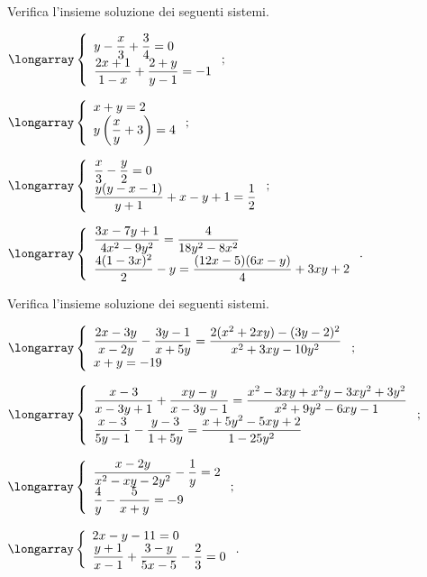 \begin{esercizio}[\Ast]
 \label{ese:22.47}
Verifica l'insieme soluzione dei seguenti sistemi.

\begin{enumeratea}
\item $\longarray\left\{\begin{array}{l}y-\dfrac{x}{3}+\dfrac{3}{4}=0\\\dfrac{2x+1}{1-x}+\dfrac{2+y}{y-1}=-1\end{array}\right.;$
\item $\longarray\left\{\begin{array}{l}x+y=2\\y\left(\dfrac{x}{y}+3\right)=4\end{array}\right.;$
\item $\longarray\left\{\begin{array}{l}\dfrac{x}{3}-\dfrac{y}{2}=0\\\dfrac{y(y-x-1)}{y+1}+x-y+1=\dfrac{1}{2}\end{array}\right.;$
\item $\longarray\left\{\begin{array}{l}\dfrac{3x-7y+1}{4x^{2}-9y^{2}}=\dfrac{4}{18y^{2}-8x^{2}}\\\dfrac{4(1-3x)^{2}}{2}-y=\dfrac{(12x-5)(6x-y)}{4}+3xy+2\end{array}\right..$
\end{enumeratea}
\end{esercizio}

\begin{esercizio}[\Ast]
 \label{ese:22.48}
Verifica l'insieme soluzione dei seguenti sistemi.

\begin{enumeratea}
\item $\longarray\left\{\begin{array}{l}\dfrac{2x-3y}{x-2y}-\dfrac{3y-1}{x+5y}=\dfrac{2(x^{2}+2xy)-(3y-2)^{2}}{x^{2}+3xy-10y^{2}}\\x+y=-19\end{array}\right.;$
\item $\longarray\left\{\begin{array}{l}\dfrac{x-3}{x-3y+1}+\dfrac{xy-y}{x-3y-1}=\dfrac{x^{2}-3xy+x^{2}y-3xy^{2}+3y^{2}}{x^{2}+9y^{2}-6xy-1}\\\dfrac{x-3}{5y-1}-\dfrac{y-3}{1+5y}=\dfrac{x+5y^{2}-5xy+2}{1-25y^{2}}\end{array}\right.;$
\item $\longarray\left\{\begin{array}{l}\dfrac{x-2y}{x^{2}-xy-2y^{2}}-\dfrac{1}{y}=2\\\dfrac{4}{y}-\dfrac{5}{x+y}=-9\end{array}\right.;$
\item $\longarray\left\{\begin{array}{l}{2x-y-11=0}\\{\dfrac{y+1}{x-1}+\dfrac{3-y}{5x-5}-\dfrac{2}{3}=0}\end{array}\right..$
\end{enumeratea}
\end{esercizio}

